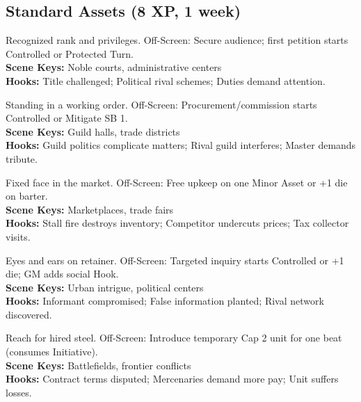 \documentclass[12pt]{article}
\begin{document}
\subsection*{Standard Assets (8 XP, 1 week)}

\begin{description}[leftmargin=*]
  \item[\textbf{Noble Title/Charter}] Recognized rank and privileges. Off-Screen: Secure audience; first petition starts Controlled or Protected Turn. \\
  \textbf{Scene Keys:} Noble courts, administrative centers \\
  \textbf{Hooks:} Title challenged; Political rival schemes; Duties demand attention.

  \item[\textbf{Guild Membership}] Standing in a working order. Off-Screen: Procurement/commission starts Controlled or Mitigate SB 1. \\
  \textbf{Scene Keys:} Guild halls, trade districts \\
  \textbf{Hooks:} Guild politics complicate matters; Rival guild interferes; Master demands tribute.

  \item[\textbf{Merchant Stall/Front}] Fixed face in the market. Off-Screen: Free upkeep on one Minor Asset or +1 die on barter. \\
  \textbf{Scene Keys:} Marketplaces, trade fairs \\
  \textbf{Hooks:} Stall fire destroys inventory; Competitor undercuts prices; Tax collector visits.

  \item[\textbf{Spy Ring/Informants}] Eyes and ears on retainer. Off-Screen: Targeted inquiry starts Controlled or +1 die; GM adds social Hook. \\
  \textbf{Scene Keys:} Urban intrigue, political centers \\
  \textbf{Hooks:} Informant compromised; False information planted; Rival network discovered.

  \item[\textbf{Mercenary Contract}] Reach for hired steel. Off-Screen: Introduce temporary Cap 2 unit for one beat (consumes Initiative). \\
  \textbf{Scene Keys:} Battlefields, frontier conflicts \\
  \textbf{Hooks:} Contract terms disputed; Mercenaries demand more pay; Unit suffers losses.


\end{description}
\end{document}
